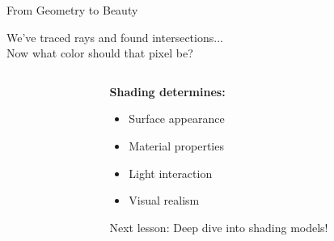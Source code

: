 \begin{frame}{From Geometry to Beauty}
    \begin{center}
        \large \textcolor{PrimaryColor}{We've traced rays and found intersections...}\\
        \vspace{0.5cm}
        \huge \textcolor{AccentColor}{Now what color should that pixel be?}
    \end{center}
    
    \begin{columns}
        \begin{column}{0.5\textwidth}
        \end{column}
        \begin{column}{0.5\textwidth}
            \textbf{Shading determines:}
            \begin{itemize}
                \item Surface appearance
                \item Material properties
                \item Light interaction
                \item Visual realism
            \end{itemize}
            
            \vspace{0.5cm}
            \alert{Next lesson:} Deep dive into shading models!
        \end{column}
    \end{columns}
\end{frame}

